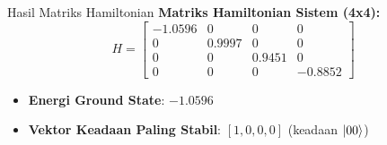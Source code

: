 \documentclass[aspectratio=169]{beamer}
\begin{document}
\begin{frame}{Hasil Matriks Hamiltonian}
    \textbf{Matriks Hamiltonian Sistem (4x4):}
    \begin{equation*}
        H = \begin{bmatrix}
            -1.0596 & 0 & 0 & 0 \\
            0 & 0.9997 & 0 & 0 \\
            0 & 0 & 0.9451 & 0 \\
            0 & 0 & 0 & -0.8852
        \end{bmatrix}
    \end{equation*}
    
    \vspace{0.3cm}
    
    \begin{itemize}
        \item \textbf{Energi Ground State}: $-1.0596$
        \item \textbf{Vektor Keadaan Paling Stabil}: $[1, 0, 0, 0]$ (keadaan $\ket{00}$)
    \end{itemize}
\end{frame}
\end{document}
